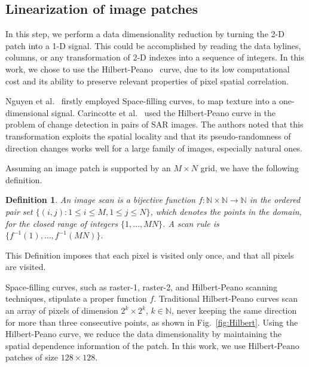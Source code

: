 \documentclass[journal]{IEEEtran}
\begin{document}
	\subsection{Linearization of image patches}\label{linearization}
	
	In this step, we perform a data dimensionality reduction by turning the 2-D patch into a 1-D signal.
	This could be accomplished by reading the data bylines, columns, or any transformation of 2-D indexes into a sequence of integers.
	In this work, we chose to use the Hilbert-Peano~\cite{Lee1994Texture} curve, due to its low computational cost and its ability to preserve relevant properties of pixel spatial correlation.
	
	Nguyen et al.~\cite{nguyen1982space} firstly employed Space-filling curves, to map texture into a one-dimensional signal.
	Carincotte et al.~\cite{Carincotte2006changeDetection} used the Hilbert-Peano curve in the problem of change detection in pairs of SAR images.
	The authors noted that this transformation exploits the spatial locality and that its pseudo-randomness
	of direction changes works well for a large family of images, especially
	natural ones.
	
	Assuming an image patch is supported by an $M \times N$ grid, we have the following definition.
	
	\newtheorem{mydef}{Definition}
	\begin{mydef}
		An image scan is a bijective function $f \colon \mathbb{N} \times \mathbb{N} \to \mathbb{N}$ in the ordered pair set $ \{(i, j): 1 \leq i \leq M , 1 \leq j \leq N\}$, which denotes the points in the domain, for the closed range of integers $\{1, \dots, M  N\}$.
		A scan rule is $\{f^{-1}(1), \dots, f^{-1}(M  N)\}$.
		\label{def:CurveFilling}
	\end{mydef}
	This Definition imposes that each pixel is visited only once, and that all pixels are visited.
	
	Space-filling curves, such as raster-1, raster-2, and Hilbert-Peano scanning techniques, stipulate a proper function $f$.
	Traditional Hilbert-Peano curves scan an array of pixels of dimension $2^k \times 2^k$, $k \in \mathbb{N}$, never keeping the same direction for more than three consecutive points, as shown in Fig.~\ref{fig:Hilbert}.
	Using the Hilbert-Peano curve, we reduce the data dimensionality by maintaining the spatial dependence information of the patch.
	In this work, we use Hilbert-Peano patches of size $128 \times 128$.
	
\end{document}

